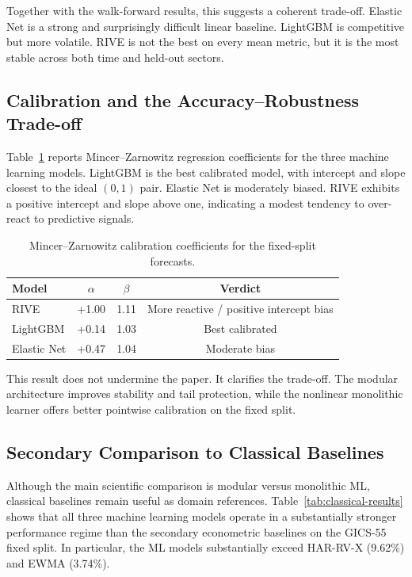 \documentclass[review]{elsarticle}
\begin{document}
Together with the walk-forward results, this suggests a coherent trade-off. Elastic Net is a strong and surprisingly difficult linear baseline. LightGBM is competitive but more volatile. RIVE is not the best on every mean metric, but it is the most stable across both time and held-out sectors.

\subsection{Calibration and the Accuracy--Robustness Trade-off}\label{sec:calibration}

Table~\ref{tab:mz-regression} reports Mincer--Zarnowitz regression coefficients for the three machine learning models. LightGBM is the best calibrated model, with intercept and slope closest to the ideal $(0,1)$ pair. Elastic Net is moderately biased. RIVE exhibits a positive intercept and slope above one, indicating a modest tendency to over-react to predictive signals.

\begin{table}[H]
\centering
\caption{Mincer--Zarnowitz calibration coefficients for the fixed-split forecasts.}
\label{tab:mz-regression}
\begin{tabular}{lccc}
\toprule
Model & $\alpha$ & $\beta$ & Verdict \\
\midrule
RIVE & +1.00 & 1.11 & More reactive / positive intercept bias \\
LightGBM & +0.14 & 1.03 & Best calibrated \\
Elastic Net & +0.47 & 1.04 & Moderate bias \\
\bottomrule
\end{tabular}
\end{table}

This result does not undermine the paper. It clarifies the trade-off. The modular architecture improves stability and tail protection, while the nonlinear monolithic learner offers better pointwise calibration on the fixed split.

\subsection{Secondary Comparison to Classical Baselines}\label{sec:classical-baselines}

Although the main scientific comparison is modular versus monolithic ML, classical baselines remain useful as domain references. Table~\ref{tab:classical-results} shows that all three machine learning models operate in a substantially stronger performance regime than the secondary econometric baselines on the GICS-55 fixed split. In particular, the ML models substantially exceed HAR-RV-X (9.62\%) and EWMA (3.74\%).
\end{document}
